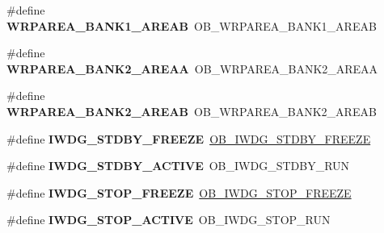 \begin{DoxyCompactItemize}
\#define {\bfseries W\+R\+P\+A\+R\+E\+A\+\_\+\+B\+A\+N\+K1\+\_\+\+A\+R\+E\+AB}~O\+B\+\_\+\+W\+R\+P\+A\+R\+E\+A\+\_\+\+B\+A\+N\+K1\+\_\+\+A\+R\+E\+AB
\item 
\mbox{\label{group___h_a_l___f_l_a_s_h___aliased___defines_ga385f3bbec731cc31de0a8f83943f678c}} 
\#define {\bfseries W\+R\+P\+A\+R\+E\+A\+\_\+\+B\+A\+N\+K2\+\_\+\+A\+R\+E\+AA}~O\+B\+\_\+\+W\+R\+P\+A\+R\+E\+A\+\_\+\+B\+A\+N\+K2\+\_\+\+A\+R\+E\+AA
\item 
\mbox{\label{group___h_a_l___f_l_a_s_h___aliased___defines_gad9e82d85eb324cdc5d4c5071a5b41dc6}} 
\#define {\bfseries W\+R\+P\+A\+R\+E\+A\+\_\+\+B\+A\+N\+K2\+\_\+\+A\+R\+E\+AB}~O\+B\+\_\+\+W\+R\+P\+A\+R\+E\+A\+\_\+\+B\+A\+N\+K2\+\_\+\+A\+R\+E\+AB
\item 
\mbox{\label{group___h_a_l___f_l_a_s_h___aliased___defines_ga29ecb28c7e5de9b73778a4de74cdba4e}} 
\#define {\bfseries I\+W\+D\+G\+\_\+\+S\+T\+D\+B\+Y\+\_\+\+F\+R\+E\+E\+ZE}~\mbox{\hyperlink{group___f_l_a_s_h_ex___option___bytes___i_w_d_g___f_r_e_e_z_e___s_a_n_d_b_y_ga2033b993c192a55757fc3fb0d8cfebc9}{O\+B\+\_\+\+I\+W\+D\+G\+\_\+\+S\+T\+D\+B\+Y\+\_\+\+F\+R\+E\+E\+ZE}}
\item 
\mbox{\label{group___h_a_l___f_l_a_s_h___aliased___defines_ga24bb71bfed2d31ab1c89e2c14617a738}} 
\#define {\bfseries I\+W\+D\+G\+\_\+\+S\+T\+D\+B\+Y\+\_\+\+A\+C\+T\+I\+VE}~O\+B\+\_\+\+I\+W\+D\+G\+\_\+\+S\+T\+D\+B\+Y\+\_\+\+R\+UN
\item 
\mbox{\label{group___h_a_l___f_l_a_s_h___aliased___defines_gafa9a4aaff8763eed2aaeae674dffd159}} 
\#define {\bfseries I\+W\+D\+G\+\_\+\+S\+T\+O\+P\+\_\+\+F\+R\+E\+E\+ZE}~\mbox{\hyperlink{group___f_l_a_s_h_ex___option___bytes___i_w_d_g___f_r_e_e_z_e___s_t_o_p_gae0c882a6f14ebe5d1969b50d5a2dbb17}{O\+B\+\_\+\+I\+W\+D\+G\+\_\+\+S\+T\+O\+P\+\_\+\+F\+R\+E\+E\+ZE}}
\item 
\mbox{\label{group___h_a_l___f_l_a_s_h___aliased___defines_gab00290e46777b5c22558554403dee8c4}} 
\#define {\bfseries I\+W\+D\+G\+\_\+\+S\+T\+O\+P\+\_\+\+A\+C\+T\+I\+VE}~O\+B\+\_\+\+I\+W\+D\+G\+\_\+\+S\+T\+O\+P\+\_\+\+R\+UN

\end{DoxyCompactItemize}
